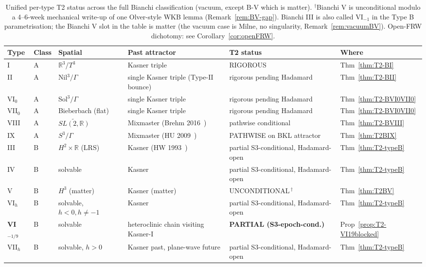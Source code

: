 \documentclass[11pt]{article}
\theoremstyle{definition}
\newcommand{\R}{\mathbb{R}}
\begin{document}
\begin{table}[ht]
\centering
\small
\begin{tabular}{|l|l|l|l|l|l|}
\hline
Type & Class & Spatial & Past attractor & T2 status & Where \\
\hline
I       & A & $\R^3$/$T^3$           & Kasner triple                        & RIGOROUS                       & Thm~\ref{thm:T2-BI} \\
II      & A & Nil$^3/\Gamma$         & single Kasner triple (Type-II bounce)& rigorous pending Hadamard       & Thm~\ref{thm:T2-BII} \\
VI$_0$  & A & Sol$^3/\Gamma$         & single Kasner triple                 & rigorous pending Hadamard       & Thm~\ref{thm:T2-BVI0VII0} \\
VII$_0$ & A & Bieberbach (flat)      & single Kasner triple                 & rigorous pending Hadamard       & Thm~\ref{thm:T2-BVI0VII0} \\
VIII    & A & $\widetilde{SL(2,\R)}$ & Mixmaster (Brehm 2016~\cite{Brehm2016})& pathwise conditional           & Thm~\ref{thm:T2-BVIII} \\
IX      & A & $S^3/\Gamma$           & Mixmaster (HU 2009~\cite{HeinzleUgglaAttractor2009}) & PATHWISE on BKL attractor & Thm~\ref{thm:T2BIX} \\
\hline
III     & B & $H^2\times\R$ (LRS)    & Kasner (HW 1993~\cite{HewittWainwright1993}) & partial S3-conditional, Hadamard-open & Thm~\ref{thm:T2-typeB} \\
IV      & B & solvable               & Kasner                                & partial S3-conditional, Hadamard-open  & Thm~\ref{thm:T2-typeB} \\
V       & B & $H^3$ (matter)         & Kasner (matter)                       & UNCONDITIONAL\,$^\dagger$        & Thm~\ref{thm:T2BV} \\
VI$_h$  & B & solvable, $h<0,h\neq -1$ & Kasner                              & partial S3-conditional, Hadamard-open  & Thm~\ref{thm:T2-typeB} \\
\textbf{VI$_{-1/9}$} & B & solvable & heteroclinic chain visiting Kasner-I~\cite{LappicyUggla2024,HewittHorwoodWainwright2003} & \textbf{PARTIAL (S3-epoch-cond.)} & Prop~\ref{prop:T2-VI19blocked} \\
VII$_h$ & B & solvable, $h>0$        & Kasner past, plane-wave future        & partial S3-conditional, Hadamard-open  & Thm~\ref{thm:T2-typeB} \\
\hline
\end{tabular}
\caption{Unified per-type T2 status across the full Bianchi classification (vacuum, except B-V which is matter). $^\dagger$Bianchi V is unconditional modulo a 4--6-week mechanical write-up of one Olver-style WKB lemma (Remark~\ref{rem:BV-gap}). Bianchi III is also called VI$_{-1}$ in the Type B parametrisation; the Bianchi V slot in the table is matter (the vacuum case is Milne, no singularity, Remark~\ref{rem:vacuumBV}). Open-FRW dichotomy: see Corollary~\ref{cor:openFRW}.}
\label{tab:unified}
\end{table}
\end{document}
